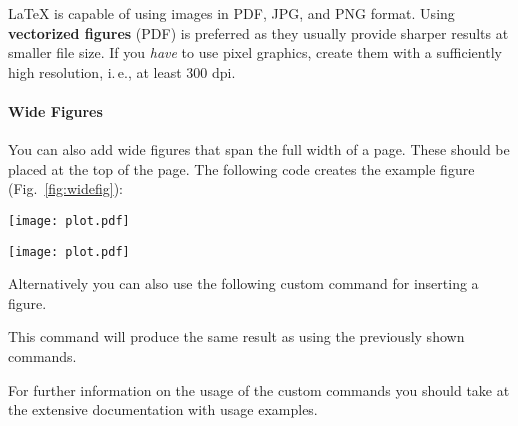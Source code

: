 LaTeX is capable of using images in PDF, JPG, and PNG format. Using \textbf{vectorized figures} (PDF) is preferred as they usually provide sharper results at smaller file size. If you \emph{have} to use pixel graphics, create them with a sufficiently high resolution, i.\,e., at least 300 dpi.


\paragraph{Wide Figures} You can also add wide figures that span the full width of a page. These should be placed at the top of the page. The following code creates the example figure (Fig.~\ref{fig:widefig}):
\begin{latex}
\begin{figure*}[t] %
\texttt{[image: plot.pdf]}
\caption{\label{fig:widefig}
  This is a full-width figure. Lorem ipsum dolor sit amet, …
}
\end{figure*}
\end{latex}

\begin{figure*}[t]
\texttt{[image: plot.pdf]}
\caption{\label{fig:widefig}This is a full-width figure. Lorem ipsum dolor sit amet, consectetur adipisicing elit, sed do eiusmod tempor incididunt ut labore et dolore magna aliqua. Ut enim ad minim veniam, quis nostrud exercitation ullamco laboris nisi ut aliquip ex ea commodo consequat.}
\end{figure*}

Alternatively you can also use the following custom command for inserting a figure.

\begin{latex}
\end{latex}

This command will produce the same result as using the previously shown commands.

For further information on the usage of the custom commands you should take at the extensive documentation with usage examples.

